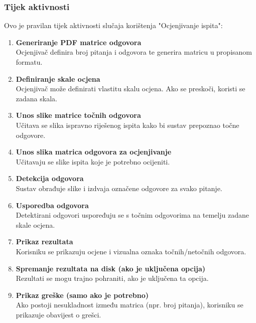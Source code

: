 \documentclass{foi}
\begin{document}
\subsubsection{Tijek aktivnosti}
\begin{flushleft}
Ovo je pravilan tijek aktivnosti slučaja korištenja "Ocjenjivanje ispita":
\begin{enumerate}
    \item \textbf{Generiranje PDF matrice odgovora} \\
    Ocjenjivač definira broj pitanja i odgovora te generira matricu u propisanom formatu.
    
    \item \textbf{Definiranje skale ocjena} \\
    Ocjenjivač može definirati vlastitu skalu ocjena. Ako se preskoči, koristi se zadana skala.
    
    \item \textbf{Unos slike matrice točnih odgovora} \\
    Učitava se slika ispravno riješenog ispita kako bi sustav prepoznao točne odgovore.
    
    \item \textbf{Unos slika matrica odgovora za ocjenjivanje} \\
    Učitavaju se slike ispita koje je potrebno ocijeniti.
    
    \item \textbf{Detekcija odgovora} \\
    Sustav obrađuje slike i izdvaja označene odgovore za svako pitanje.
    
    \item \textbf{Usporedba odgovora} \\
    Detektirani odgovori uspoređuju se s točnim odgovorima na temelju zadane skale ocjena.
    
    \item \textbf{Prikaz rezultata} \\
    Korisniku se prikazuju ocjene i vizualna oznaka točnih/netočnih odgovora.
    
    \item \textbf{Spremanje rezultata na disk (ako je uključena opcija)} \\
    Rezultati se mogu trajno pohraniti, ako je uključena ta opcija.
    
    \item \textbf{Prikaz greške (samo ako je potrebno)} \\
    Ako postoji nesukladnost između matrica (npr. broj pitanja), korisniku se prikazuje obavijest o grešci.
\end{enumerate}
\end{flushleft}
\end{document}
